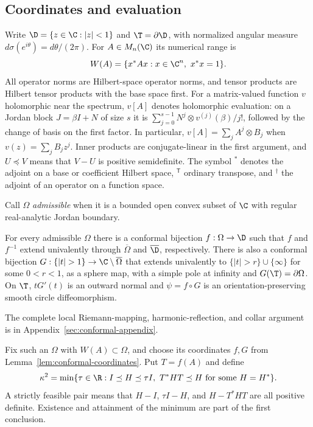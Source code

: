 
\subsection*{Coordinates and evaluation}
Write $\D=\{z\in\C:|z|<1\}$ and $\T=\partial\D$, with normalized
angular measure $d\sigma(e^{i\theta})=d\theta/(2\pi)$. For
$A\in M_n(\C)$ its numerical range is
\[
 W(A)=\{x^*Ax:x\in\C^n,\ x^*x=1\}.
\]
All operator norms are Hilbert-space operator norms, and tensor products are
Hilbert tensor products with the base space first. For a matrix-valued function $v$
holomorphic near the spectrum, $v[A]$ denotes holomorphic evaluation:
on a Jordan block $J=\beta I+N$ of size $s$ it is
$\sum_{j=0}^{s-1}N^j\otimes v^{(j)}(\beta)/j!$, followed by the
change of basis on the first factor. In particular,
$v[A]=\sum_jA^j\otimes B_j$ when $v(z)=\sum_jB_jz^j$.
Inner products are conjugate-linear in the first argument, and $U\preceq V$
means that $V-U$ is positive semidefinite. The symbol ${}^*$ denotes the
adjoint on a base or coefficient Hilbert space, ${}^{\mathsf T}$ ordinary
transpose, and ${}^\dagger$ the adjoint of an operator on a function space.

Call $\Omega$ \emph{admissible} when it is a bounded open convex subset of
$\C$ with regular real-analytic Jordan boundary.

\begin{lemma}\label{lem:conformal-coordinates}
For every admissible $\Omega$ there is a conformal bijection
$f:\Omega\to\D$ such that $f$ and $f^{-1}$ extend univalently
through $\overline\Omega$ and $\overline\D$, respectively. There is also
a conformal bijection $G:\{|t|>1\}\to\C\setminus\overline\Omega$
that extends univalently to
$\{|t|>r\}\cup\{\infty\}$ for some $0<r<1$, as a sphere map, with a
simple pole at infinity and $G(\T)=\partial\Omega$. On $\T$, $tG'(t)$ is an outward normal and
$\psi=f\circ G$ is an orientation-preserving smooth circle diffeomorphism.
\end{lemma}
The complete local Riemann-mapping, harmonic-reflection, and collar argument
is in Appendix~\ref{sec:conformal-appendix}.


Fix such an $\Omega$ with $W(A)\subset\Omega$, and choose its coordinates
$f,G$ from Lemma~\ref{lem:conformal-coordinates}. Put $T=f(A)$ and define
\begin{equation}\label{eq:minimum}
 \kappa^2=\min\{\tau\in\R:I\preceq H\preceq\tau I,
                  \ T^*HT\preceq H\text{ for some }H=H^*\}.
\end{equation}
A strictly feasible pair means that $H-I$, $\tau I-H$, and
$H-T^*HT$ are all positive definite. Existence and attainment of the
minimum are part of the first conclusion.

